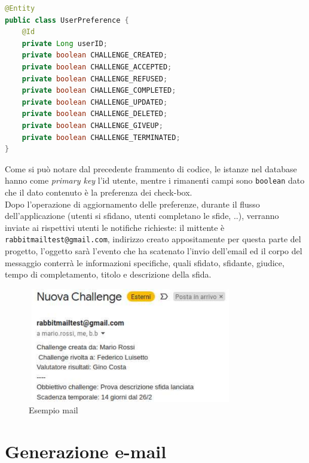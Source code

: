\begin{lstlisting}[language=Java, caption=Frammento codice preferenze utente, basicstyle=\footnotesize]
@Entity
public class UserPreference {
    @Id
    private Long userID;
    private boolean CHALLENGE_CREATED;
    private boolean CHALLENGE_ACCEPTED;
    private boolean CHALLENGE_REFUSED;
    private boolean CHALLENGE_COMPLETED;
    private boolean CHALLENGE_UPDATED;
    private boolean CHALLENGE_DELETED;
    private boolean CHALLENGE_GIVEUP;
    private boolean CHALLENGE_TERMINATED;
}
\end{lstlisting}

Come si può notare dal precedente frammento di codice, le istanze nel database hanno come \textit{primary key} l'id utente, mentre i rimanenti campi sono \texttt{boolean} dato che il dato contenuto è la preferenza dei check-box.\\
Dopo l'operazione di aggiornamento delle preferenze, durante il flusso dell'applicazione (utenti si sfidano, utenti completano le sfide, ..), verranno inviate ai rispettivi utenti le notifiche richieste: il mittente è \texttt{rabbitmailtest@gmail.com}, indirizzo creato appositamente per questa parte del progetto, l'oggetto sarà l'evento che ha scatenato l'invio dell'email ed il corpo del messaggio conterrà le informazioni specifiche, quali sfidato, sfidante, giudice, tempo di completamento, titolo e descrizione della sfida.

\begin{figure}[H]
    \centering
    \includegraphics[width=9cm, height=5cm]{images/prova-email.pdf}
    \caption{Esempio mail}
\end{figure}

\section{Generazione e-mail}

